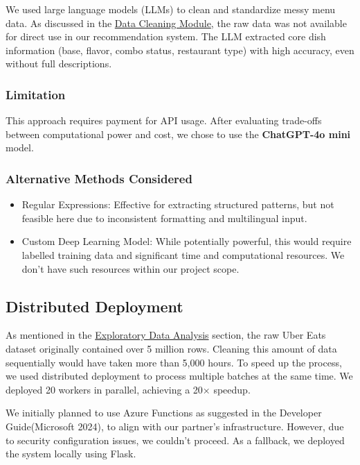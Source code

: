 \documentclass[
  11pt,
  a4paper,
  DIV=11,
  numbers=noendperiod]{scrartcl}
\providecommand{\tightlist}{%
  \setlength{\itemsep}{0pt}\setlength{\parskip}{0pt}}\usepackage{longtable,booktabs,array}
\begin{document}
We used large language models (LLMs) to clean and standardize messy menu
data. As discussed in the \hyperref[data-cleaning-module]{Data Cleaning
Module}, the raw data was not available for direct use in our
recommendation system. The LLM extracted core dish information (base,
flavor, combo status, restaurant type) with high accuracy, even without
full descriptions.

\subsubsection{Limitation}\label{limitation}

This approach requires payment for API usage. After evaluating
trade-offs between computational power and cost, we chose to use the
\textbf{ChatGPT-4o mini} model.

\subsubsection{Alternative Methods
Considered}\label{alternative-methods-considered}

\begin{itemize}
\tightlist
\item
  Regular Expressions: Effective for extracting structured patterns, but
  not feasible here due to inconsistent formatting and multilingual
  input.
\item
  Custom Deep Learning Model: While potentially powerful, this would
  require labelled training data and significant time and computational
  resources. We don't have such resources within our project scope.
\end{itemize}

\subsection{Distributed Deployment}\label{distributed-deployment}

As mentioned in the \hyperref[exploratory-data-analysis]{Exploratory
Data Analysis} section, the raw Uber Eats dataset originally contained
over 5 million rows. Cleaning this amount of data sequentially would
have taken more than 5,000 hours. To speed up the process, we used
distributed deployment to process multiple batches at the same time. We
deployed 20 workers in parallel, achieving a 20× speedup.

We initially planned to use Azure Functions as suggested in the
Developer Guide(Microsoft 2024), to align with our partner's
infrastructure. However, due to security configuration issues, we
couldn't proceed. As a fallback, we deployed the system locally using
Flask.
\end{document}
